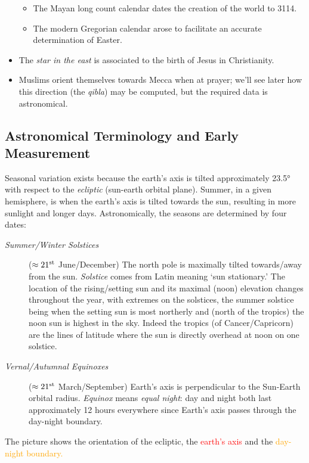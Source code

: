 \begin{itemize}
\begin{itemize}
	  \item The Mayan long count calendar dates the creation of the world to 3114\BC.
	  \item The modern Gregorian calendar arose to facilitate an accurate determination of Easter.
	\end{itemize}
	\item The \emph{star in the east} is associated to the birth of Jesus in Christianity.
	\item Muslims orient themselves towards Mecca when at prayer; we'll see later how this direction (the \emph{qibla}) may be computed, but the required data is astronomical.
\end{itemize}
\goodbreak



\subsection{Astronomical Terminology and Early Measurement}\label{ssec:astro1}

Seasonal variation exists because the earth's axis is tilted approximately \ang{23.5} with respect to the \emph{ecliptic} (sun-earth orbital plane). Summer, in a given hemisphere, is when the earth's axis is tilted towards the sun, resulting in more sunlight and longer days. Astronomically, the seasons are determined by four dates:
\begin{description}
	\item[\normalfont\emph{Summer/Winter Solstices}] ($\approx 21\textsuperscript{st}$ June/December) The north pole is maximally tilted towards/away from the sun. \emph{Solstice} comes from Latin meaning `sun stationary.' The location of the rising/setting sun and its maximal (noon) elevation changes throughout the year, with extremes on the solstices, the summer solstice being when the setting sun is most northerly and (north of the tropics) the noon sun is highest in the sky. Indeed the tropics (of Cancer/Capricorn) are the lines of latitude where the sun is directly overhead at noon on one solstice.
	\item[\normalfont\emph{Vernal/Autumnal Equinoxes}] ($\approx 21\textsuperscript{st}$ March/September) Earth's axis is perpendicular to the Sun-Earth orbital radius. \emph{Equinox} means \emph{equal night}: day and night both last approximately 12 hours everywhere since Earth's axis passes through the day-night boundary.
\end{description}

The picture shows the orientation of the ecliptic, the \textcolor{red}{earth's axis} and the \textcolor{orange}{day-night boundary.}

